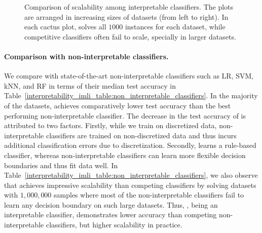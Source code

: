 \begin{figure}[!t]
	
	\caption{Comparison of scalability among interpretable classifiers. The plots are arranged in increasing sizes of datasets (from left to right). In each cactus plot, {\imli} solves all $ 1000 $ instances for each dataset, while competitive classifiers often fail to scale, specially in larger datasets.}
	\label{interpretability_imli_fig:interpretable_classifiers}
\end{figure}






\paragraph{Comparison with non-interpretable classifiers.} We compare {\imli} with state-of-the-art non-interpretable classifiers such as LR, SVM, kNN, and RF in terms of their median test accuracy in Table~\ref{interpretability_imli_table:non_interpretable_classifiers}. In the majority of the datasets, {\imli} achieves comparatively lower test accuracy than the best performing non-interpretable classifier. The decrease in the test accuracy of {\imli} is attributed to two factors. Firstly, while we train {\imli} on discretized data, non-interpretable classifiers are trained on non-discretized data and thus {\imli} incurs additional classification errors due to discretization. Secondly, {\imli} learns a rule-based classifier, whereas non-interpretable classifiers can learn more flexible decision boundaries and thus fit data well. In Table~\ref{interpretability_imli_table:non_interpretable_classifiers}, we also observe that {\imli} achieves impressive scalability than competing classifiers by solving datasets with $ 1, 000,000 $  samples where most of the non-interpretable classifiers fail to learn any decision boundary on such large datasets. Thus, {\imli}, being an interpretable classifier, demonstrates lower accuracy than competing non-interpretable classifiers, but higher scalability in practice. 


